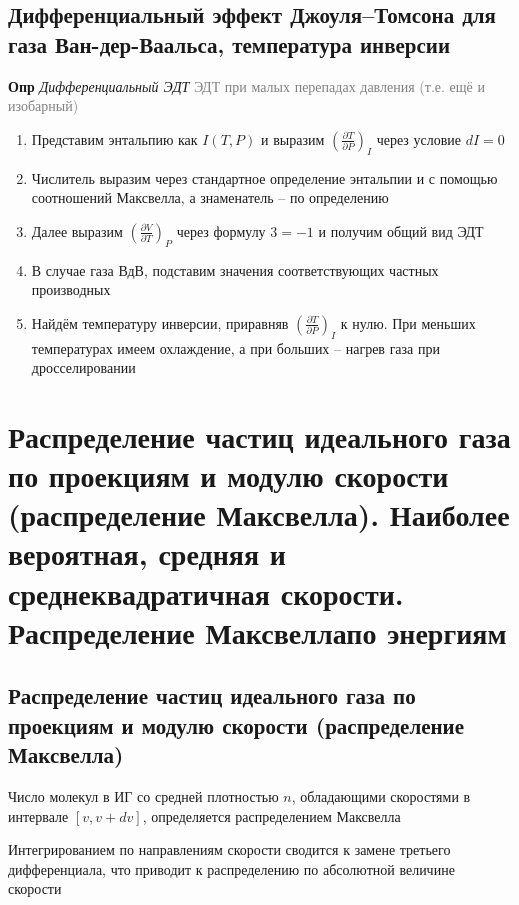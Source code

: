 \documentclass[a4paper, 14pt]{article}
\begin{document}
    \subsection{Дифференциальный эффект Джоуля–Томсона для газа Ван-дер-Ваальса, температура инверсии}
    
    \textbf{Опр} \textit{Дифференциальный ЭДТ} \textcolor{gray}{ЭДТ при малых перепадах давления (т.е. ещё и изобарный)}
    
    \begin{enumerate}
        \item Представим энтальпию как $I(T, P)$ и выразим $(\frac{\partial T}{\partial P})_I$ через условие $dI = 0$
        \item Числитель выразим через стандартное определение энтальпии и с помощью соотношений Максвелла, а
        знаменатель -- по определению
        \item Далее выразим $(\frac{\partial V}{\partial T})_P$ через формулу $3 = -1$ и получим общий вид ЭДТ
        \item В случае газа ВдВ, подставим значения соответствующих частных производных
        \item Найдём температуру инверсии, приравняв $(\frac{\partial T}{\partial P})_I$ к нулю.
        При меньших температурах имеем охлаждение, а при больших -- нагрев газа при дросселировании
    \end{enumerate}
    
    \section{Распределение частиц идеального газа по проекциям и модулю скорости (распределение Максвелла).
    Наиболее вероятная, средняя и среднеквадратичная скорости.
    Распределение Максвеллапо энергиям}
    
    \subsection{Распределение частиц идеального газа по проекциям и модулю скорости (распределение Максвелла)}
    
    Число молекул в ИГ со средней плотностью $n$, обладающими скоростями в интервале $[v, v + dv]$, определяется
    распределением Максвелла
    
    Интегрированием по направлениям скорости сводится к замене третьего дифференциала, что приводит к распределению
    по абсолютной величине скорости
    
\end{document}

